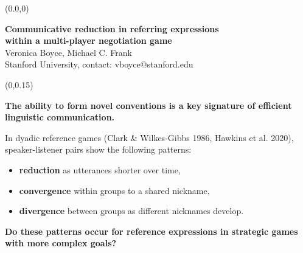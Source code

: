 \documentclass[10pt, xcolor=table, dvipsnames]{beamer}
\begin{document}
	\begin{textblock}{1}(0.0,0)
		\begin{tcolorbox}[colback=Violet!30]{}
			
			
			\begin{centering} 
				\bigskip
				
				{\LARGE\textbf{Communicative reduction in referring expressions \\ within a
						multi-player negotiation game}}\\
				{\Large Veronica Boyce, Michael C. Frank} \\
				{Stanford University, contact: vboyce@stanford.edu}	
				
			\end{centering}
		\end{tcolorbox}
	\end{textblock}
	
	\begin{textblock}{.32}(0,0.15)
		\begin{tcolorbox}[title= {\centering Goals }]
			\vspace{.5em}
			\begin{small}\centering
				\bigskip
			\textbf{The ability to form novel conventions is a key signature of efficient
			linguistic communication.}
			
			\vspace{.5em}
 In dyadic reference games (Clark \& Wilkes-Gibbs 1986, Hawkins et al. 2020), speaker-listener pairs show the following patterns:
 \begin{itemize}
 	\item \textbf{reduction} as utterances shorter over time,
 	 \item \textbf{convergence} within groups to a shared nickname,
 	  \item \textbf{divergence} between groups as different nicknames develop.
   \end{itemize}

\vspace{.5em}
\textbf{Do these patterns occur for reference expressions in strategic games with more complex goals?}
\vspace{.5em}


			\end{small}
		\end{tcolorbox}
	\end{textblock}
	
	
\end{document}
